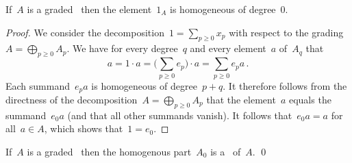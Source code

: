 \begin{lemma}
  If~$A$ is a graded~\algebra{$\kf$} then the element~$1_A$ is homogeneous of degree~$0$.
\end{lemma}


\begin{proof}
  We consider the decomposition~$1 = \sum_{p \geq 0} x_p$ with respect to the grading~$A = \bigoplus_{p \geq 0} A_p$.
  We have for every degree~$q$ and every element~$a$ of~$A_q$ that
  \[
    a
    =
    1 \cdot a
    =
    \Biggl( \sum_{p \geq 0} e_p \Biggr) \cdot a
    =
    \sum_{p \geq 0} e_p a  \,.
  \]
  Each summand~$e_p a$ is homogeneous of degree~$p + q$.
  It therefore follows from the directness of the decomposition~$A = \bigoplus_{p \geq 0} A_p$ that the element~$a$ equals the summand~$e_0 a$ (and that all other summands vanish).
  It follows that~$e_0 a = a$ for all~$a \in A$, which shows that~$1 = e_0$.
\end{proof}


\begin{corollary}
  If~$A$ is a graded~\algebra{$\kf$} then the homogenous part~$A_0$ is a~{\subalgebra{$\kf$}} of~$A$.
  \qed
\end{corollary}




